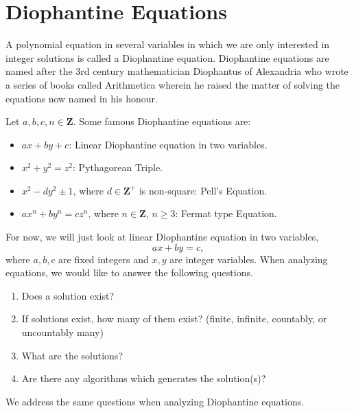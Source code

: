 \section{Diophantine Equations}
A polynomial equation in several variables in which we are only interested
in integer solutions is called a Diophantine equation. Diophantine equations are
named after the 3rd century mathematician Diophantus of Alexandria who wrote
a series of books called Arithmetica wherein he raised the matter of solving the
equations now named in his honour.
\begin{Example}{}{}
    Let $ a,b,c,n\in\mathbf{Z} $. Some famous Diophantine equations are:
    \begin{itemize}
        \item $ ax+by+c $: Linear Diophantine equation in two variables.
        \item $ x^2+y^2=z^2 $: Pythagorean Triple.
        \item $ x^2-dy^2\pm 1 $, where $ d\in\mathbf{Z}^+ $ is non-square: Pell's Equation.
        \item $ ax^n+by^n=cz^n $, where $ n\in\mathbf{Z} $, $ n\ge 3 $: Fermat type Equation.
    \end{itemize}
\end{Example}
For now, we will just look at linear Diophantine equation in two variables,
\[ ax+by=c, \]
where $ a,b,c $ are fixed integers and $ x,y $ are integer variables. When analyzing equations,
we would like to answer the following questions.
\begin{enumerate}[(1)]
    \item Does a solution exist?
    \item If solutions exist, how many of them exist? (finite, infinite, countably, or uncountably many)
    \item What are the solutions?
    \item Are there any algorithms which generates the solution(s)?
\end{enumerate}
We address the same questions when analyzing Diophantine equations.
